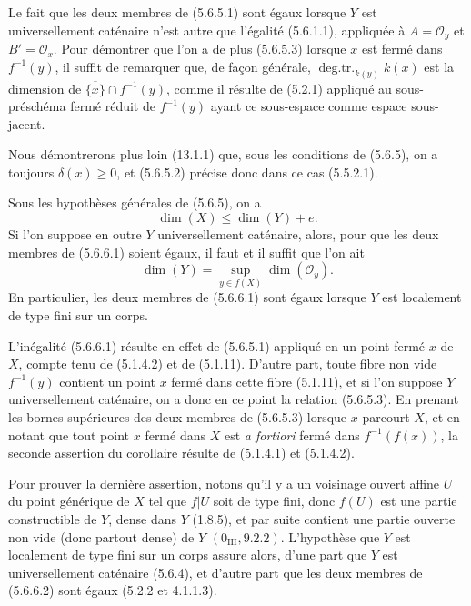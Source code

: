 Le fait que les deux membres de (5.6.5.1) sont égaux lorsque $Y$ est
universellement caténaire n'est autre que l'égalité (5.6.1.1), appliquée à
$A=\mathcal O_y$ et $B'=\mathcal O_x$. Pour démontrer que l'on a de plus
(5.6.5.3) lorsque $x$ est fermé dans $f^{-1}(y)$, il suffit de remarquer que,
de façon générale, $\operatorname{deg.tr.}_{k(y)}k(x)$ est la dimension de
$\overline{\{x\}}\cap f^{-1}(y)$, comme il résulte de (5.2.1) appliqué au
sous-préschéma fermé réduit de $f^{-1}(y)$ ayant ce sous-espace comme espace
sous-jacent.


Nous démontrerons plus loin (13.1.1) que, sous les conditions de (5.6.5), on
a toujours $\delta(x)\geq0$, et (5.6.5.2) précise donc dans ce cas (5.5.2.1).

\begin{corollary}[5.6.6]
\label{IV.2.s5.6.6-fr}
Sous les hypothèses générales de (5.6.5), on a
\begin{equation}
\dim(X)\leq\dim(Y)+e.
\tag{5.6.6.1}\label{IV.2.s5.6.6.1-fr}
\end{equation}
Si l'on suppose en outre $Y$ universellement caténaire, alors, pour que les
deux membres de (5.6.6.1) soient égaux, il faut et il suffit que l'on ait
\begin{equation}
\dim(Y)=\sup_{y\in f(X)}\dim(\mathcal O_y).
\tag{5.6.6.2}\label{IV.2.s5.6.6.2-fr}
\end{equation}
En particulier, les deux membres de (5.6.6.1) sont égaux lorsque $Y$ est
localement de type fini sur un corps.
\end{corollary}

L'inégalité (5.6.6.1) résulte en effet de (5.6.5.1) appliqué en un point
fermé $x$ de $X$, compte tenu de (5.1.4.2) et de (5.1.11). D'autre part,
toute fibre non vide $f^{-1}(y)$ contient un point $x$ fermé dans cette
fibre (5.1.11), et si l'on suppose $Y$ universellement caténaire, on a donc
en ce point la relation (5.6.5.3). En prenant les bornes supérieures des deux
membres de (5.6.5.3) lorsque $x$ parcourt $X$, et en notant que tout point
$x$ fermé dans $X$ est \emph{a fortiori} fermé dans $f^{-1}(f(x))$, la
seconde assertion du corollaire résulte de (5.1.4.1) et (5.1.4.2).

Pour prouver la dernière assertion, notons qu'il y a un voisinage ouvert
affine $U$ du point générique de $X$ tel que $f|U$ soit de type fini, donc
$f(U)$ est une partie constructible de $Y$, dense dans $Y$ (1.8.5), et par
suite contient une partie ouverte non vide (donc partout dense) de $Y$
$(0_{\mathrm{III}},9.2.2)$. L'hypothèse que $Y$ est localement de type fini
sur un corps assure alors, d'une part que $Y$ est universellement caténaire
(5.6.4), et d'autre part que les deux membres de (5.6.6.2) sont égaux
(5.2.2 et 4.1.1.3).

